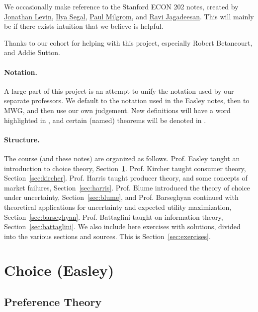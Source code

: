 \documentclass[12pt]{article}
\begin{document}
We occasionally make reference to the Stanford ECON 202 notes, created by \href{https://www.gsb.stanford.edu/faculty-research/faculty/jonathan-levin}{Jonathan Levin}, \href{https://web.stanford.edu/~isegal/}{Ilya Segal}, \href{https://milgrom.people.stanford.edu/}{Paul Milgrom}, and \href{https://sites.google.com/site/ravijagadeesan/}{Ravi Jagadeesan}. This will mainly be if there exists intuition that we believe is helpful.

Thanks to our cohort for helping with this project, especially Robert Betancourt, and Addie Sutton.

\paragraph{Notation.} A large part of this project is an attempt to unify the notation used by our separate professors. We default to the notation used in the Easley notes, then to MWG, and then use our own judgement. New definitions will have a word highlighted in , and certain (named) theorems will be denoted in . 

\paragraph{Structure.} The course (and these notes) are organized as follows. Prof. Easley taught an introduction to choice theory, Section~\ref{sec:easley}. Prof. Kircher taught consumer theory, Section~\ref{sec:kircher}. Prof. Harris taught producer theory, and some concepts of market failures, Section~\ref{sec:harris}. Prof. Blume introduced the theory of choice under uncertainty, Section~\ref{sec:blume}, and Prof. Barseghyan continued with theoretical applications for uncertainty and expected utility maximization, Section~\ref{sec:barseghyan}. Prof. Battaglini taught on information theory, Section~\ref{sec:battaglini}. We also include here exercises with solutions, divided into the various sections and sources. This is Section~\ref{sec:exercises}.


\newpage
\section{Choice (Easley)}\label{sec:easley}

\subsection{Preference Theory}
\end{document}
